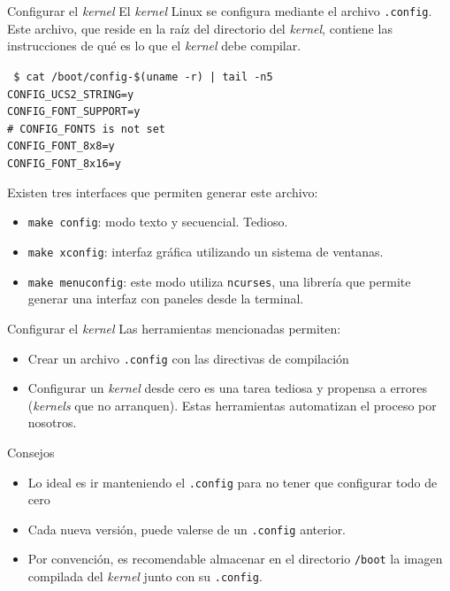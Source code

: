 \begin{frame}{Configurar el \textit{kernel}}
  El \textit{kernel} Linux se configura mediante el archivo
  \texttt{.config}. Este archivo, que reside en la raíz del directorio del
  \textit{kernel}, contiene las instrucciones de qué es lo que el
  \textit{kernel} debe compilar.

  \begin{block}{}
    \tiny {
    \texttt{%
\$ cat /boot/config-\$(uname -r) | tail -n5 \\
CONFIG\_UCS2\_STRING=y \\
CONFIG\_FONT\_SUPPORT=y \\
\# CONFIG\_FONTS is not set \\
CONFIG\_FONT\_8x8=y \\
CONFIG\_FONT\_8x16=y}}
  \end{block}
\pause
Existen tres interfaces que permiten generar este archivo:
\begin{itemize}
\item \texttt{make config}: modo texto y secuencial. \alert{Tedioso}.
\item \texttt{make xconfig}: interfaz gráfica utilizando un sistema de
  ventanas.
\item \texttt{make menuconfig}: este modo utiliza \texttt{ncurses}, una
  librería que permite generar una interfaz con paneles desde la terminal.
\end{itemize}
\end{frame}

\begin{frame}{Configurar el \textit{kernel}}
Las herramientas mencionadas permiten:
\begin{itemize}
\item Crear un archivo \texttt{.config} con las directivas de compilación
\item Configurar un \textit{kernel} desde cero es una tarea tediosa y
  propensa a errores (\textit{kernels} que no arranquen). Estas
  herramientas automatizan el proceso por nosotros.
\end{itemize}

\begin{block}{Consejos}
\begin{itemize}
\item Lo ideal es ir manteniendo el \texttt{.config} para no tener que
  configurar todo de cero

\item Cada nueva versión, puede valerse de un \texttt{.config} anterior.

\item Por convención, es recomendable almacenar en el directorio
  \texttt{/boot} la imagen compilada del \textit{kernel} junto con su
  \texttt{.config}.
\end{itemize}
\end{block}
\end{frame}

